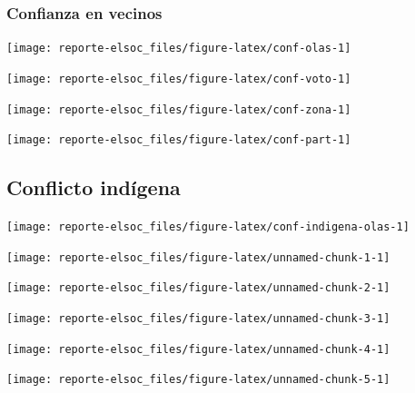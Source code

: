 \documentclass[
  12pt,
]{book}
\begin{document}
\hypertarget{confianza-en-vecinos}{%
\subsubsection{Confianza en vecinos}\label{confianza-en-vecinos}}

\begin{center}\texttt{[image: reporte-elsoc\_files/figure-latex/conf-olas-1]} \end{center}

\begin{center}\texttt{[image: reporte-elsoc\_files/figure-latex/conf-voto-1]} \end{center}

\begin{center}\texttt{[image: reporte-elsoc\_files/figure-latex/conf-zona-1]} \end{center}

\begin{center}\texttt{[image: reporte-elsoc\_files/figure-latex/conf-part-1]} \end{center}

\hypertarget{conflicto-induxedgena}{%
\subsection{Conflicto indígena}\label{conflicto-induxedgena}}

\begin{center}\texttt{[image: reporte-elsoc\_files/figure-latex/conf-indigena-olas-1]} \end{center}

\begin{center}\texttt{[image: reporte-elsoc\_files/figure-latex/unnamed-chunk-1-1]} \end{center}

\begin{center}\texttt{[image: reporte-elsoc\_files/figure-latex/unnamed-chunk-2-1]} \end{center}

\begin{center}\texttt{[image: reporte-elsoc\_files/figure-latex/unnamed-chunk-3-1]} \end{center}

\begin{center}\texttt{[image: reporte-elsoc\_files/figure-latex/unnamed-chunk-4-1]} \end{center}

\begin{center}\texttt{[image: reporte-elsoc\_files/figure-latex/unnamed-chunk-5-1]} \end{center}
\end{document}
